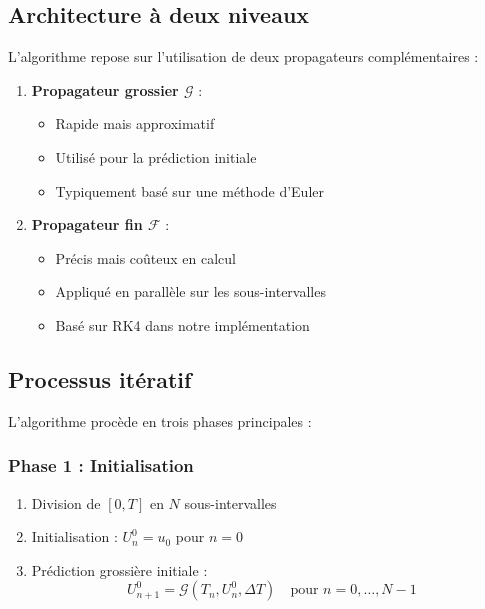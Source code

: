\subsection{Architecture à deux niveaux}
L'algorithme repose sur l'utilisation de deux propagateurs complémentaires :

\begin{enumerate}
    \item \textbf{Propagateur grossier $\mathcal{G}$} :
    \begin{itemize}
        \item Rapide mais approximatif
        \item Utilisé pour la prédiction initiale
        \item Typiquement basé sur une méthode d'Euler
    \end{itemize}
    
    \item \textbf{Propagateur fin $\mathcal{F}$} :
    \begin{itemize}
        \item Précis mais coûteux en calcul
        \item Appliqué en parallèle sur les sous-intervalles
        \item Basé sur RK4 dans notre implémentation
    \end{itemize}
\end{enumerate}

\subsection{Processus itératif}
L'algorithme procède en trois phases principales :

\subsubsection{Phase 1 : Initialisation}
\begin{enumerate}
    \item Division de $[0,T]$ en $N$ sous-intervalles
    \item Initialisation : $U_n^0 = u_0$ pour $n = 0$
    \item Prédiction grossière initiale :
    \begin{equation}
        U_{n+1}^0 = \mathcal{G}(T_n, U_n^0, \Delta T) \quad \text{pour } n = 0,\ldots,N-1
    \end{equation}
\end{enumerate}

